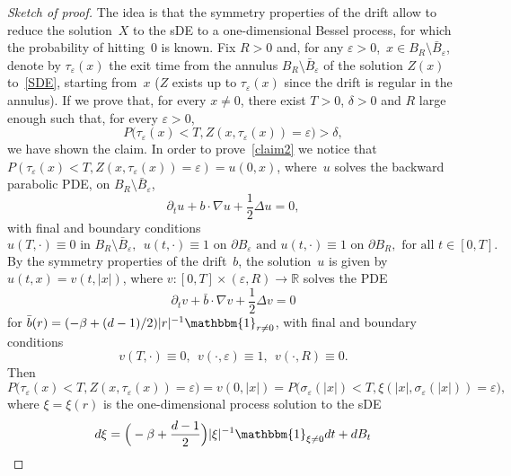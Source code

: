 \documentclass[a4paper,10pt]{article}
\newcommand\1{\mathbbm{1}}
\newcommand{\mr}{\mathbb{R}}
\newcommand{\eps}{\varepsilon}
\numberwithin{equation}{section}
\begin{document}
\begin{proof}[Sketch of proof]
The idea is that the symmetry properties of the drift allow to reduce the solution~$X$ to the sDE to a one-dimensional Bessel process, for which the probability of hitting~$0$ is known. Fix $R>0$ and, for any $\eps>0$,~$x \in B_R\setminus\bar{B}_\eps$, denote by $\tau_\eps(x)$ the exit time from the annulus $B_R\setminus\bar{B}_\eps$ of the solution $Z(x)$ to~\eqref{SDE}, starting from~$x$ ($Z$ exists up to $\tau_\eps(x)$ since the drift is regular in the annulus). If we prove that, for every $x\neq0$, there exist $T>0$, $\delta>0$ and $R$ large enough such that, for every $\eps>0$,
\begin{equation}
P\big( \tau_\eps(x)<T,Z(x,\tau_\eps(x))=\eps\big)>\delta ,\label{claim2}
\end{equation}
we have shown the claim. In order to prove~\eqref{claim2} we notice that $P(\tau_\eps(x)<T,Z(x,\tau_\eps(x))=\eps)=u(0,x)$, where~$u$ solves the backward parabolic PDE, on $B_R\setminus\bar{B}_\eps$,
\begin{equation*}
\partial_tu+b\cdot\nabla u+\frac12\Delta u=0 ,
\end{equation*}
with final and boundary conditions
\begin{equation*}
u(T,\cdot)\equiv0 \text{ in } B_R\setminus\bar{B}_\eps,\ \ u(t,\cdot) \equiv 1 \text{ on } \partial B_\eps \text{ and } 
u(t,\cdot)\equiv 1 \text{ on } \partial B_R, \text{ for all } t \in [0,T].
\end{equation*}
By the symmetry properties of the drift~$b$, the solution~$u$ is given by $u(t,x)=v(t,|x|)$, where $v \colon [0,T]\times(\eps,R)\rightarrow\mr$ solves the PDE
\begin{equation*}
\partial_t v+\bar{b}\cdot\nabla v+\frac12\Delta v=0
\end{equation*}
for $\bar{b}(r)=(-\beta+(d-1)/2)|r|^{-1} \1_{r\neq0}$, with final and boundary conditions
\begin{equation*}
v(T,\cdot)\equiv0,\ \ v(\cdot,\eps)\equiv1,\ \ v(\cdot,R)\equiv0 .
\end{equation*}
Then 
\begin{equation}
\label{tau_sigma_ident}
P\big(\tau_\eps(x)<T,Z(x,\tau_\eps(x))=\eps\big)=v(0,|x|)=P\big(\sigma_\eps(|x|)<T,\xi(|x|,\sigma_\eps(|x|))=\eps\big) , 
\end{equation}
where $\xi=\xi(r)$ is the one-dimensional process solution to the sDE
\begin{equation*}
d\xi= \Big(-\beta+\frac{d-1}{2} \Big) |\xi|^{-1} \1_{\xi\neq0} dt + dB_t

\end{equation*}
\end{proof}
\end{document}

